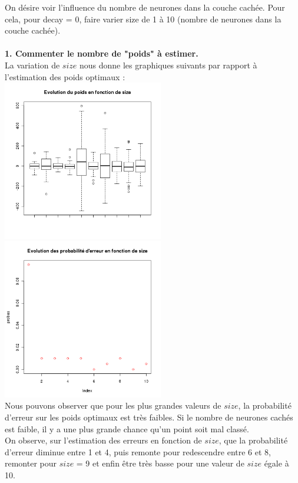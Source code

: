 \documentclass[a4paper, 10pt]{article}
\begin{document}
On désire voir l'influence du nombre de neurones dans la couche cachée. Pour cela, pour decay = 0, faire varier size de 1 à 10 (nombre de neurones dans la couche cachée).\\ \\
\textbf{1. Commenter le nombre de "poids" à estimer.}\\
La variation de $size$ nous donne les graphiques suivants par rapport à l'estimation des poids optimaux :\\
\includegraphics[height = 7cm, width = 7cm]{plots/poids_q3_1.png}
\includegraphics[height = 7cm, width = 7cm]{plots/probas_erreur_q3_1.png}\\
Nous pouvons observer que pour les plus grandes valeurs de $size$, la probabilité d'erreur sur les poids optimaux est très faibles.
Si le nombre de neurones cachés est faible, il y a une plus grande chance qu'un point soit mal classé.\\
On observe, sur l'estimation des erreurs en fonction de $size$, que la probabilité d'erreur diminue entre 1 et 4, puis remonte pour redescendre entre 6 et 8, remonter pour $size$ = 9 et enfin être très basse pour une valeur de $size$ égale à 10.\\ \\
\end{document}
